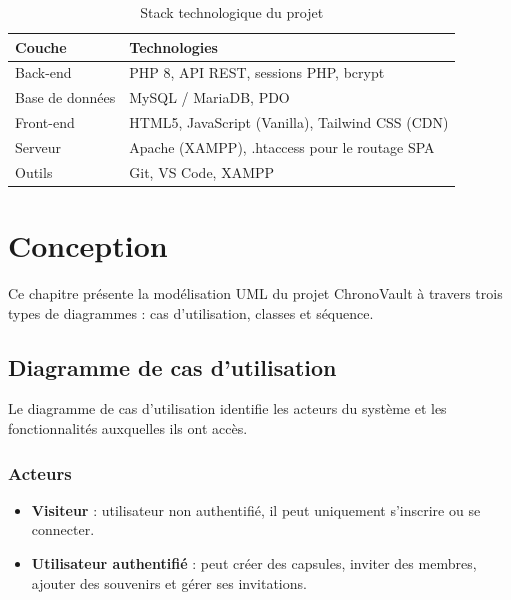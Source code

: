 \documentclass[12pt,a4paper]{report}
\begin{document}
\begin{table}[H]
    \centering
    \begin{tabularx}{\textwidth}{l X}
        \toprule
        \textbf{Couche} & \textbf{Technologies} \\
        \midrule
        Back-end & PHP 8, API REST, sessions PHP, bcrypt \\
        Base de données & MySQL / MariaDB, PDO \\
        Front-end & HTML5, JavaScript (Vanilla), Tailwind CSS (CDN) \\
        Serveur & Apache (XAMPP), .htaccess pour le routage SPA \\
        Outils & Git, VS Code, XAMPP \\
        \bottomrule
    \end{tabularx}
    \caption{Stack technologique du projet}
\end{table}


\chapter{Conception}

Ce chapitre présente la modélisation UML du projet ChronoVault à travers trois types de diagrammes : cas d'utilisation, classes et séquence.

\section{Diagramme de cas d'utilisation}

Le diagramme de cas d'utilisation identifie les acteurs du système et les fonctionnalités auxquelles ils ont accès.

\subsection{Acteurs}

\begin{itemize}[noitemsep]
    \item \textbf{Visiteur} : utilisateur non authentifié, il peut uniquement s'inscrire ou se connecter.
    \item \textbf{Utilisateur authentifié} : peut créer des capsules, inviter des membres, ajouter des souvenirs et gérer ses invitations.
\end{itemize}
\end{document}
